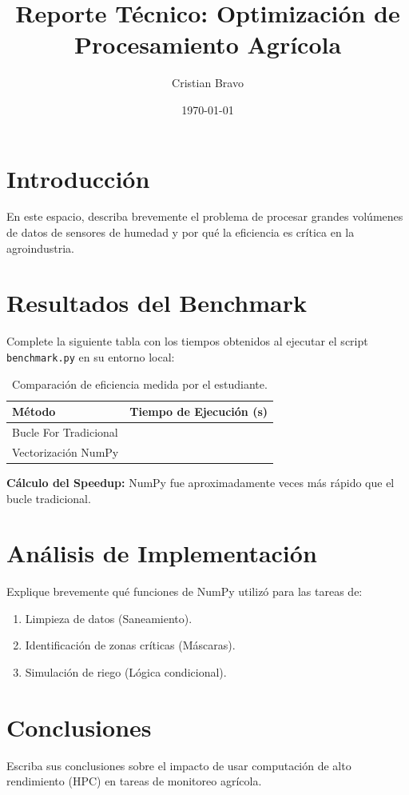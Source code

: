 \documentclass[12pt]{article}
\title{Reporte Técnico: Optimización de Procesamiento Agrícola}
\author{Cristian Bravo}
\date{\today}
\begin{document}
\maketitle

\section{Introducción}
En este espacio, describa brevemente el problema de procesar grandes volúmenes de datos de sensores de humedad y por qué la eficiencia es crítica en la agroindustria.

\section{Resultados del Benchmark}
Complete la siguiente tabla con los tiempos obtenidos al ejecutar el script \texttt{benchmark.py} en su entorno local:

\begin{table}[h]
\centering
\begin{tabular}{lr}
\toprule
\textbf{Método} & \textbf{Tiempo de Ejecución (s)} \\
\midrule
Bucle For Tradicional &  \\
Vectorización NumPy &  \\
\bottomrule
\end{tabular}
\caption{Comparación de eficiencia medida por el estudiante.}
\end{table}

\textbf{Cálculo del Speedup:} 
NumPy fue aproximadamente \underline{\hspace{2cm}} veces más rápido que el bucle tradicional.

\section{Análisis de Implementación}
Explique brevemente qué funciones de NumPy utilizó para las tareas de:
\begin{enumerate}
    \item Limpieza de datos (Saneamiento).
    \item Identificación de zonas críticas (Máscaras).
    \item Simulación de riego (Lógica condicional).
\end{enumerate}

\section{Conclusiones}
Escriba sus conclusiones sobre el impacto de usar computación de alto rendimiento (HPC) en tareas de monitoreo agrícola.
\end{document}
